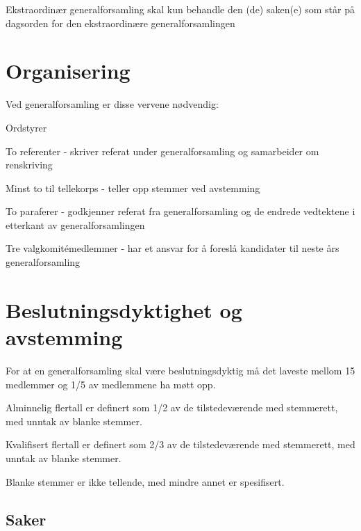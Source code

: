Ekstraordinær generalforsamling skal kun behandle den (de) saken(e) som står på dagsorden for den ekstraordinære generalforsamlingen
 

\section{Organisering} \label{sec:organisering}
\vspace{23pt}
Ved generalforsamling er disse vervene nødvendig: 

\begin{liste}
	\item Ordstyrer
	\item To referenter - skriver referat under generalforsamling og samarbeider om \mbox{renskriving}
	\item Minst to til tellekorps - teller opp stemmer ved avstemming
	\item To paraferer - godkjenner referat fra generalforsamling og de endrede vedtektene i etterkant av generalforsamlingen
	\item Tre valgkomitémedlemmer - har et ansvar for å foreslå kandidater til neste års generalforsamling
	
\end{liste}

\newpage
\section{Beslutningsdyktighet og avstemming}
\vspace{23pt}

For at en generalforsamling skal være beslutningsdyktig må det laveste mellom 15 medlemmer og 1/5 av medlemmene ha møtt opp. 

\begin{liste}
	\item Alminnelig flertall er definert som 1/2 av de tilstedeværende med stemmerett, med unntak av blanke stemmer. 
	\item Kvalifisert flertall er definert som 2/3 av de tilstedeværende med stemmerett, med unntak av blanke stemmer.
\end{liste}


Blanke stemmer er ikke tellende, med mindre annet er spesifisert.

\subsection{Saker}

